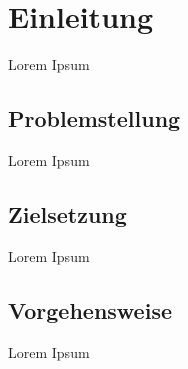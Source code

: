 
\chapter{Einleitung}\label{ch:einleitung}
Lorem Ipsum
\section{Problemstellung}
Lorem Ipsum
\section{Zielsetzung}
Lorem Ipsum
\section{Vorgehensweise}
Lorem Ipsum